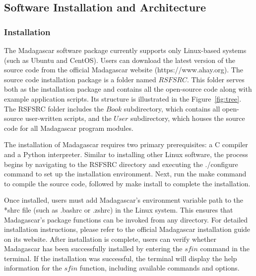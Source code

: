 \subsection{Software Installation and Architecture}
\subsubsection{Installation}
The Madagascar software package currently supports only Linux-based systems (such as Ubuntu and CentOS). Users can download the latest version of the source code from the official Madagascar website (https://www.ahay.org). The source code installation package is a folder named $RSFSRC$. This folder serves both as the installation package and contains all the open-source code along with example application scripts. Its structure is illustrated in the Figure~\ref{fig:tree}.
{The RSFSRC folder includes the $Book$ subdirectory, which contains all open-source user-written scripts, and the $User$ subdirectory, which houses the source code for all Madagascar program modules.}

The installation of Madagascar requires two primary prerequisites: a C compiler and a Python interpreter. Similar to installing other Linux software, the process begins by navigating to the RSFSRC directory and executing the ./configure command to set up the installation environment. Next, run the make command to compile the source code, followed by make install to complete the installation.

Once installed, users must add Madagascar’s environment variable path to the *shrc file (such as .bashrc or .zshrc) in the Linux system. This ensures that Madagascar’s package functions can be invoked from any directory. For detailed installation instructions, please refer to the official Madagascar installation guide on its website. After installation is complete, users can verify whether Madagascar has been successfully installed by entering the $sfin$ command in the terminal. If the installation was successful, the terminal will display the help information for the $sfin$ function, including available commands and options.

